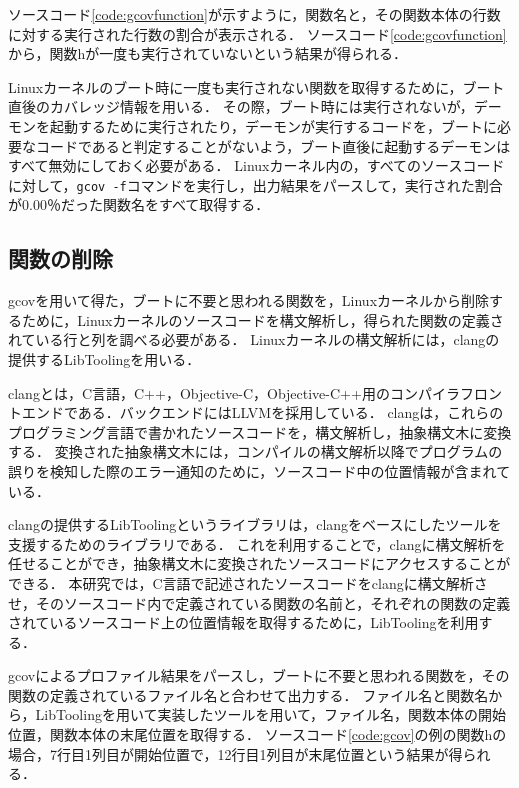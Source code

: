 \documentclass[graduation-thesis]{mlarticle}
\begin{document}
ソースコード\ref{code:gcovfunction}が示すように，関数名と，その関数本体の行数に対する実行された行数の割合が表示される．
ソースコード\ref{code:gcovfunction}から，関数hが一度も実行されていないという結果が得られる．

Linuxカーネルのブート時に一度も実行されない関数を取得するために，ブート直後のカバレッジ情報を用いる．
その際，ブート時には実行されないが，デーモンを起動するために実行されたり，デーモンが実行するコードを，ブートに必要なコードであると判定することがないよう，ブート直後に起動するデーモンはすべて無効にしておく必要がある．
Linuxカーネル内の，すべてのソースコードに対して，\texttt{gcov -f}コマンドを実行し，出力結果をパースして，実行された割合が0.00％だった関数名をすべて取得する．

\subsection{関数の削除}
\label{implementation:function}
gcovを用いて得た，ブートに不要と思われる関数を，Linuxカーネルから削除するために，Linuxカーネルのソースコードを構文解析し，得られた関数の定義されている行と列を調べる必要がある．
Linuxカーネルの構文解析には，clangの提供するLibToolingを用いる．

clangとは，C言語，C++，Objective-C，Objective-C++用のコンパイラフロントエンドである．バックエンドにはLLVMを採用している．
clangは，これらのプログラミング言語で書かれたソースコードを，構文解析し，抽象構文木に変換する．
変換された抽象構文木には，コンパイルの構文解析以降でプログラムの誤りを検知した際のエラー通知のために，ソースコード中の位置情報が含まれている．

clangの提供するLibToolingというライブラリは，clangをベースにしたツールを支援するためのライブラリである．
これを利用することで，clangに構文解析を任せることができ，抽象構文木に変換されたソースコードにアクセスすることができる．
本研究では，C言語で記述されたソースコードをclangに構文解析させ，そのソースコード内で定義されている関数の名前と，それぞれの関数の定義されているソースコード上の位置情報を取得するために，LibToolingを利用する．

gcovによるプロファイル結果をパースし，ブートに不要と思われる関数を，その関数の定義されているファイル名と合わせて出力する．
ファイル名と関数名から，LibToolingを用いて実装したツールを用いて，ファイル名，関数本体の開始位置，関数本体の末尾位置を取得する．
ソースコード\ref{code:gcov}の例の関数hの場合，7行目1列目が開始位置で，12行目1列目が末尾位置という結果が得られる．
\end{document}
